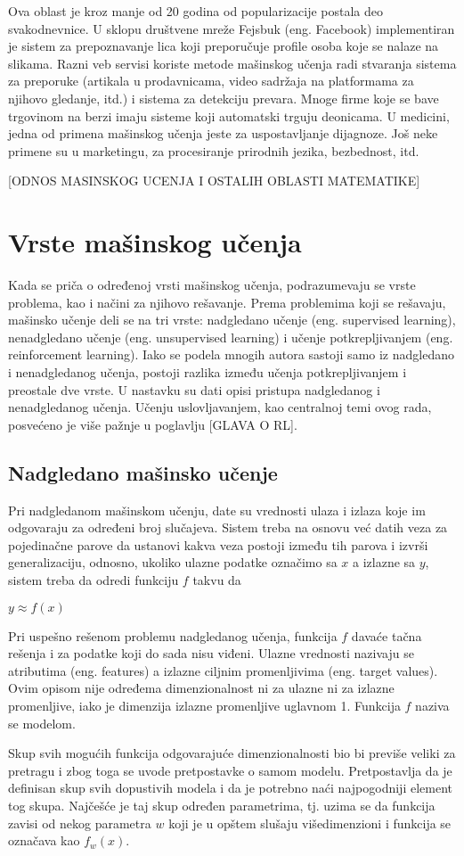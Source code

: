 Ova oblast je kroz manje od 20 godina od popularizacije postala deo svakodnevnice. U sklopu društvene mreže Fejsbuk (eng. Facebook) implementiran je sistem za prepoznavanje lica koji preporučuje profile osoba koje se nalaze na slikama. Razni veb servisi koriste metode mašinskog učenja radi stvaranja sistema za preporuke (artikala u prodavnicama, video sadržaja na platformama za njihovo gledanje, itd.) i sistema za detekciju prevara. Mnoge firme koje se bave trgovinom na berzi imaju sisteme koji automatski trguju deonicama. U medicini, jedna od primena mašinskog učenja jeste za uspostavljanje dijagnoze. Još neke primene su u marketingu, za procesiranje prirodnih jezika, bezbednost, itd.

[ODNOS MASINSKOG UCENJA I OSTALIH OBLASTI MATEMATIKE]
\section{Vrste mašinskog učenja}

Kada se priča o određenoj vrsti mašinskog učenja, podrazumevaju se vrste problema, kao i načini za njihovo rešavanje. Prema problemima koji se rešavaju, mašinsko učenje deli se na tri vrste: nadgledano učenje (eng. supervised learning), nenadgledano učenje (eng. unsupervised learning) i učenje potkrepljivanjem (eng. reinforcement learning). Iako se podela mnogih autora sastoji samo iz nadgledano i nenadgledanog učenja, postoji razlika između učenja potkrepljivanjem i preostale dve vrste. U nastavku su dati opisi pristupa nadgledanog i nenadgledanog učenja. Učenju uslovljavanjem, kao centralnoj temi ovog rada, posvećeno je više pažnje u poglavlju [GLAVA O RL]. 

\subsection{Nadgledano mašinsko učenje}

Pri nadgledanom mašinskom učenju, date su vrednosti ulaza i izlaza koje im odgovaraju za određeni broj slučajeva. Sistem treba na osnovu već datih veza za pojedinačne parove da ustanovi kakva veza postoji između tih parova i izvrši generalizaciju, odnosno, ukoliko ulazne podatke označimo sa $x$ a izlazne sa $y$, sistem treba da odredi funkciju $f$ takvu da 
\begin{center}
	$y \approx f(x)$
\end{center}
Pri uspešno rešenom problemu nadgledanog učenja, funkcija $f$ davaće tačna rešenja i za podatke koji do sada nisu viđeni.
Ulazne vrednosti nazivaju se atributima (eng. features) a izlazne ciljnim promenljivima (eng. target values). Ovim opisom nije određema dimenzionalnost ni za ulazne ni za izlazne promenljive, iako je dimenzija izlazne promenljive uglavnom 1. Funkcija $f$ naziva se modelom. \par
Skup svih mogućih funkcija odgovarajuće dimenzionalnosti bio bi previše veliki za pretragu i zbog toga se uvode pretpostavke o samom modelu. Pretpostavlja da je definisan skup svih dopustivih modela i da je potrebno naći najpogodniji element tog skupa. Najčešće je taj skup određen parametrima, tj. uzima se da funkcija zavisi od nekog parametra $w$ koji je u opštem slušaju višedimenzioni i funkcija se označava kao $f_w(x)$.

